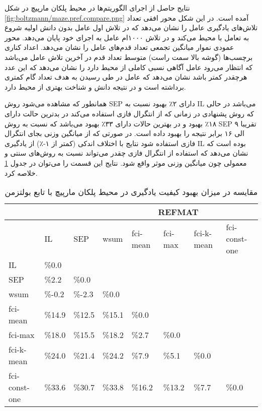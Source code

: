  نتایج حاصل از اجرای الگوریتم‌ها در محیط پلکان مارپیچ در شکل
\ref{fig:boltzmann/maze.pref.compare.png}
آمده است. در این شکل محور افقی تعداد تلاش‌های یادگیری عامل را نشان می‌دهد که در تلاش اول عامل بدون دانش اولیه شروع به تعامل با محیط می‌کند و در تلاش ۱۰۰۰ام عامل به اجرای خود پایان می‌دهد. محور عمودی نموار میانگین تجمعی تعداد قدم‌های عامل را نشان می‌دهد. اعداد کناری برچسب‌ها (گوشه بالا سمت راست) متوسط تعداد قدم‌ در آخرین تلاش عامل می‌باشد که انتظار می‌رود عامل آگاهی نسبی کاملی از محیط دارد را نشان می‌دهد که این عدد هرچقدر کمتر باشد نشان می‌دهد که عامل در طی رسیدن به هدف تعداد گام کمتری برداشته است و در نتیجه دانش و شناخت بهتری از محیط دارد.


همانطور که مشاهده می‌شود روش SEP دارای ۲٪ بهبود نسبت به IL می‌باشد در حالی که روش پشنهادی در زمانی که از انتگرال فازی استفاده می‌کند در بدترین حالت دارای ۱۸٪ بهبود و در بهترین حالات دارای ۳۳٪ بهبود می‌باشد که نسبت به روش SEP تقریبا ۹ الی ۱۶ برابر نتیجه را بهبود داده است. در صورتی که از میانگین وزنی بجای انتگرال فازی استفاده شود نتایج با اختلاف اندکی (کمتر از ۱-٪)  از یادگیری IL بوده است که نشان ‌می‌دهد که استفاده از انتگرال فازی چقدر می‌تواند نسبت به روش‌های سنتی و معمولی چون میانگین وزنی موثر واقع شود. نتایج این قسمت را می‌توان در جدول
\ref{tab:maze_pref_compare}
خلاصه کرد.

\begin{table}
\centering
\caption{مقایسه در میزان بهبود کیفیت یادگیری در محیط پلکان مارپیچ با تابع بولتزمن}\label{tab:maze_pref_compare}
\begin{latin}
\begin{tabular}{|*8{l|}}
\hline
\multicolumn{3}{|c|}{}& \multicolumn{5}{c|}{REFMAT}
\\\hline
& IL & SEP & wsum & fci-mean & fci-max & fci-k-mean & fci-const-one  
\\\hline
IL & \%0.0 & & & & & &  
\\\hline
SEP & \%2.2 & \%0.0 & & & & &  
\\\hline
wsum & \%-0.2 & \%-2.3 & \%0.0 & & & &  
\\\hline
fci-mean & \%14.9 & \%12.5 & \%15.1 & \%0.0 & & &  
\\\hline
fci-max & \%18.0 & \%15.5 & \%18.2 & \%2.7 & \%0.0 & &  
\\\hline
fci-k-mean & \%24.0 & \%21.4 & \%24.2 & \%7.9 & \%5.1 & \%0.0 &  
\\\hline
fci-const-one & \%33.6 & \%30.7 & \%33.8 & \%16.2 & \%13.2 & \%7.7 & \%0.0  
\\\hline
\end{tabular}
\end{latin}
\end{table}

